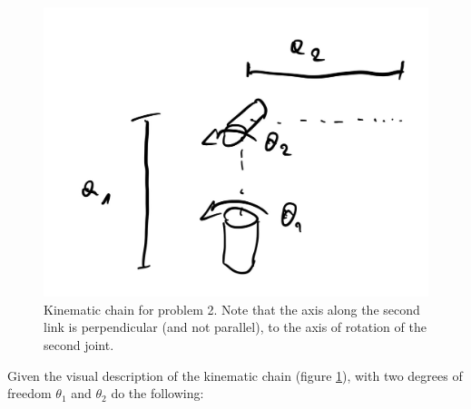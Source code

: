 \documentclass{exam}
\begin{document}
\begin{questions}
\question

\begin{figure}[!ht]
\centering
\includegraphics[scale=0.2]{task6.jpg}
\caption{Kinematic chain for problem 2.
  Note that the axis along the second link is perpendicular (and not parallel), to the axis of rotation of the second joint.}
\label{fig2}
\end{figure}

Given the visual description of the kinematic chain (figure \ref{fig2}), with two degrees of freedom $\theta_1$ and $\theta_2$
do the following:


\end{questions}
\end{document}

